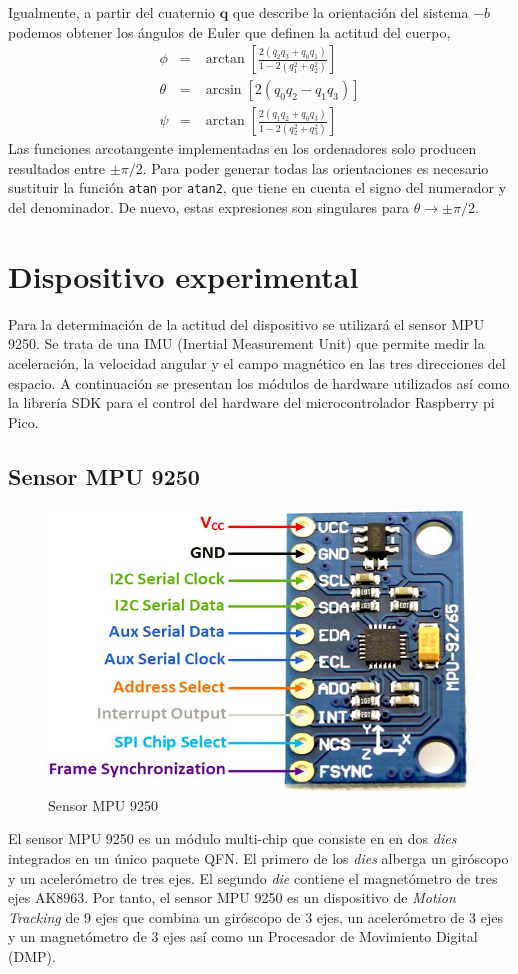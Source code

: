 \documentclass[a4paper,12pt]{book}
\begin{document}
Igualmente, a partir del cuaternio $\mathbf{q}$ que describe la orientación del sistema $-b$ podemos obtener los ángulos de Euler que definen la actitud del cuerpo,
\begin{eqnarray}
    \phi &=& \arctan\left[\frac{2(q_2q_3 + q_0q_1)}{1 - 2(q_1^2 + q_2^2)}\right]\\
    \theta &=& \arcsin\left[ 2(q_0q_2 - q_1q_3)\right]\\
    \psi &=& \arctan\left[\frac{2(q_1q_2 + q_0q_3)}{1 - 2(q_2^2 + q_3^2)}\right]
\end{eqnarray}
Las funciones arcotangente implementadas en los ordenadores solo producen resultados entre $\pm\pi/2$. Para poder generar todas las orientaciones es necesario sustituir la función \texttt{atan} por \texttt{atan2}, que tiene en cuenta el signo del numerador y del denominador. De nuevo, estas expresiones son singulares para $\theta\rightarrow \pm \pi/2$.



\chapter{Dispositivo experimental}\label{chapter:setup}

Para la determinación de la actitud del dispositivo se utilizará el sensor MPU 9250. Se trata de una IMU (Inertial Measurement Unit) que permite medir la aceleración, la velocidad angular y el campo magnético en las tres direcciones del espacio. A continuación se presentan los módulos de hardware utilizados así como la librería SDK para el control del hardware del microcontrolador Raspberry pi Pico.


\section{Sensor MPU 9250}
\begin{figure}[!h]
    \centering
	\includegraphics[width=0.3\linewidth]{MPU9250-Pin-Diagram.jpg}
 	\caption{Sensor MPU 9250}
 	\label{fig:mpu9250_pinout}
\end{figure}


El sensor MPU 9250 \cite{mpu9250datasheet} es un módulo multi-chip que consiste en en dos \emph{dies} integrados en un único paquete QFN. El primero de los \emph{dies} alberga un giróscopo y un acelerómetro de tres ejes. El segundo \emph{die} contiene el magnetómetro de tres ejes AK8963. Por tanto, el sensor MPU 9250 es un dispositivo de \emph{Motion Tracking} de 9 ejes que combina un giróscopo de 3 ejes, un acelerómetro de 3 ejes y un magnetómetro de 3 ejes así como un Procesador de Movimiento Digital (DMP).  
\end{document}
